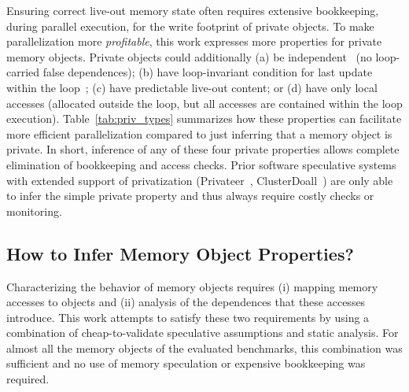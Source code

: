 Ensuring correct live-out memory state often requires extensive bookkeeping,
during parallel execution, for the write footprint of private objects. To make
parallelization more \textit{profitable}, this work expresses more properties
for private memory objects. Private objects could additionally (a) be
independent~\cite{ARRAY_privatization} (no loop-carried false dependences); (b)
have loop-invariant condition for last update within the
loop~\cite{ARRAY_privatization}; (c) have predictable live-out content;
or (d) have only local accesses (allocated outside the loop, but all
accesses are contained within the loop execution).
%
%
Table~\ref{tab:priv_types} summarizes how these properties can facilitate more
efficient parallelization compared to just inferring that a memory object is
private. In short, inference of any of these four private properties allows
complete elimination of bookkeeping and access checks. Prior software
speculative systems with extended support of privatization (Privateer~\cite{},
ClusterDoall~\cite{}) are only able to infer the simple private property and
thus always require costly checks or monitoring.




\subsection{How to Infer Memory Object Properties?}

Characterizing the behavior of memory objects requires
(i) mapping memory accesses to objects and (ii) analysis of the dependences that
these accesses introduce.
This work attempts to satisfy these two requirements by using a combination of
cheap-to-validate speculative assumptions and static analysis. For almost all
the memory objects of the evaluated benchmarks, this combination was sufficient
and no use of memory speculation or expensive bookkeeping was required.

